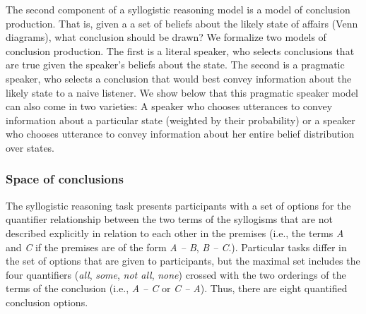 \documentclass[floatsintext, doc]{apa6}
\newcommand{\mht}[1]{{\textcolor{Blue}{[mht: #1]}}}
\begin{document}
The second component of a syllogistic reasoning model is a model of conclusion production. 
That is, given a a set of beliefs about the likely state of affairs (Venn diagrams), what conclusion should be drawn?
We formalize two models of conclusion production.
The first is a literal speaker, who selects conclusions that are true given the speaker's beliefs about the state. 
The second is a pragmatic speaker, who selects a conclusion that would best convey information about the likely state to a naive listener. 
We show below that this pragmatic speaker model can also come in two varieties: A speaker who chooses utterances to convey information about a particular state (weighted by their probability) or a speaker who chooses utterance to convey information about her entire belief distribution over states. 

\subsubsection{Space of conclusions}

The syllogistic reasoning task presents participants with a set of options for the quantifier relationship between the two terms of the syllogisms that are not described explicitly in relation to each other in the premises (i.e., the terms \emph{A} and \emph{C} if the premises are of the form \emph{A -- B}, \emph{B -- C}.). 
Particular tasks differ in the set of options that are given to participants, but the maximal set includes the four quantifiers  (\emph{all}, \emph{some}, \emph{not all}, \emph{none}) crossed with the two orderings of the terms of the conclusion (i.e., \emph{A -- C} or \emph{C -- A}).
Thus, there are eight quantified conclusion options. 
\end{document}
